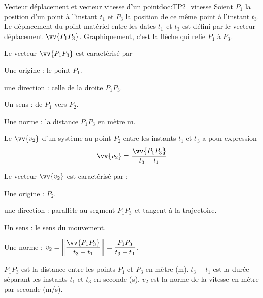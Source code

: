 \begin{doc}{Vecteur déplacement et vecteur vitesse d'un point}{doc:TP2_vitesse}
  Soient $P_1$ la position d'un point à l'instant $t_1$ et $P_3$ la position de ce même point à l'instant $t_3$.
  Le déplacement du point matériel entre les dates $t_1$ et $t_3$ est défini par le vecteur déplacement $\vv{P_1 P_3}$.
  Graphiquement, c'est la flèche qui relie $P_1$ à $P_3$. 
  
  Le vecteur $\vv{P_1 P_3}$ est caractérisé par
  \begin{multicols}{2}
  \begin{listePoints}
    \item Une origine : le point $P_1$.
    \item une direction : celle de la droite $P_1 P_3$.
    \item Un sens : de $P_1$ vers $P_2$.
    \item Une norme : la distance $P_1 P_3$ en mètre \unit{m}.
  \end{listePoints}
  \end{multicols}
  
  \begin{encart}
    Le  $\vv{v_2}$ d'un système au point $P_2$ entre les instants $t_1$ et $t_3$ a pour expression
    \begin{equation*}
      \vv{v_2} = \frac{\vv{P_1 P_3}}{t_3 - t_1}
    \end{equation*}
  \end{encart}
  
  Le vecteur $\vv{v_2}$ est caractérisé par :
  \begin{multicols}{2}
  \begin{listePoints}
    \item Une origine : $P_2$.
    \item une direction : parallèle au segment $P_1 P_3$ et tangent à la trajectoire.
    \item Un sens : le sens du mouvement.
    \item Une norme : $v_2 
    = \displaystyle \norm{\frac{\vv{P_1 P_3}}{t_3 - t_1}}
    = \displaystyle \frac{P_1 P_3}{t_3 - t_1}$.
  \end{listePoints}
  \end{multicols}
  
  $P_1 P_3$ est la distance entre les points $P_1$ et $P_3$ en mètre (m). $t_3 - t_1$ est la durée séparant les instants $t_1$ et $t_3$ en seconde (s). $v_2$ est la norme de la vitesse en mètre par seconde (m/s).
\end{doc}



